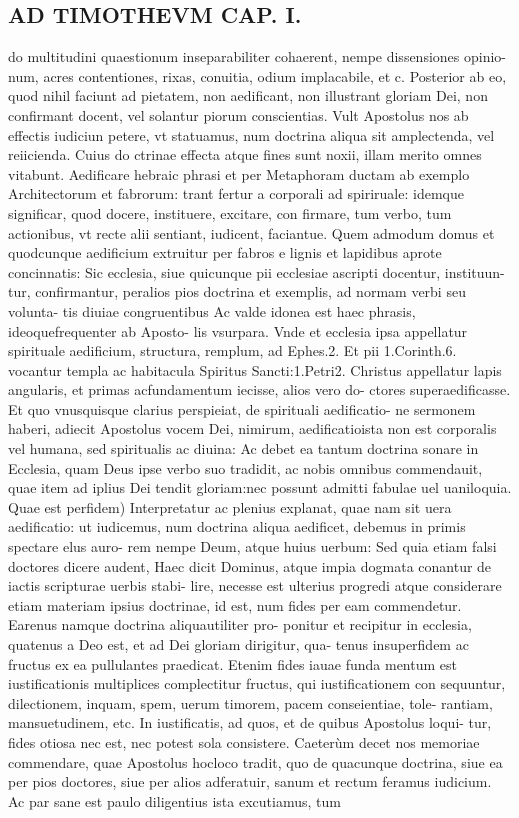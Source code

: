 \documentclass{article}
\begin{document}
\begin{pages}
\section*{AD TIMOTHEVM CAP. I. }
\marginpar{[ p.16 ]}\pstart do multitudini quaestionum inseparabiliter cohaerent, nempe dissensiones opinio- num, acres contentiones, rixas, conuitia, odium implacabile, et c. Posterior ab eo, quod nihil faciunt ad pietatem, non aedificant, non illustrant gloriam Dei, non confirmant docent, vel solantur piorum conscientias. Vult Apostolus nos ab effectis iudiciun petere, vt statuamus, num doctrina aliqua sit amplectenda, vel reiicienda. Cuius do ctrinae effecta atque  fines sunt noxii, illam merito omnes vitabunt. Aedificare hebraic phrasi et per Metaphoram ductam ab exemplo Architectorum et fabrorum: trant fertur a corporali ad spiriruale: idemque  significar, quod docere, instituere, excitare, con firmare, tum verbo, tum actionibus, vt recte alii sentiant, iudicent, faciantue. Quem admodum domus et quodcunque  aedificium extruitur per fabros e lignis et lapidibus aprote concinnatis: Sic ecclesia, siue quicunque  pii ecclesiae ascripti docentur, instituun- tur, confirmantur, peralios pios doctrina et exemplis, ad normam verbi seu volunta- tis diuiae congruentibus  Ac valde idonea est haec phrasis, ideoquefrequenter ab Aposto- lis vsurpara. Vnde et ecclesia ipsa appellatur spirituale aedificium, structura, remplum, ad Ephes.2. Et pii 1.Corinth.6. vocantur templa ac habitacula Spiritus Sancti:1.Petri2. Christus appellatur lapis angularis, et primas acfundamentum iecisse, alios vero do- ctores superaedificasse. Et quo vnusquisque  clarius perspieiat, de spirituali aedificatio- ne sermonem haberi, adiecit Apostolus vocem Dei, nimirum, aedificatioista non est corporalis vel humana, sed spiritualis ac diuina: Ac debet ea tantum doctrina sonare in Ecclesia, quam Deus ipse verbo suo tradidit, ac nobis omnibus commendauit, quae item ad iplius Dei tendit gloriam:nec possunt admitti fabulae uel uaniloquia.  \pend\pstart Quae est perfidem) Interpretatur ac plenius explanat, quae nam sit uera aedificatio: ut iudicemus, num doctrina aliqua aedificet, debemus in primis spectare elus auro- rem nempe Deum, atque huius uerbum: Sed quia etiam falsi doctores dicere audent, Haec dicit Dominus, atque impia dogmata conantur de iactis scripturae uerbis stabi- lire, necesse est ulterius progredi atque considerare etiam materiam ipsius doctrinae, id est, num fides per eam commendetur. Earenus namque  doctrina aliquautiliter pro- ponitur et recipitur in ecclesia, quatenus a Deo est, et ad Dei gloriam dirigitur, qua- tenus insuperfidem ac fructus ex ea pullulantes praedicat. Etenim fides iauae funda mentum est iustificationis multiplices complectitur fructus, qui iustificationem con sequuntur, dilectionem, inquam, spem, uerum timorem, pacem conseientiae, tole- rantiam, mansuetudinem, etc. In iustificatis, ad quos, et de quibus Apostolus loqui- tur, fides otiosa nec est, nec potest sola consistere.  \pend\pstart Caeterùm decet nos memoriae commendare, quae Apostolus hocloco tradit, quo de quacunque doctrina, siue ea per pios doctores, siue per alios adferatuir, sanum et rectum feramus iudicium. Ac par sane est paulo diligentius ista excutiamus, tum 
\end{pages}
\end{document}
